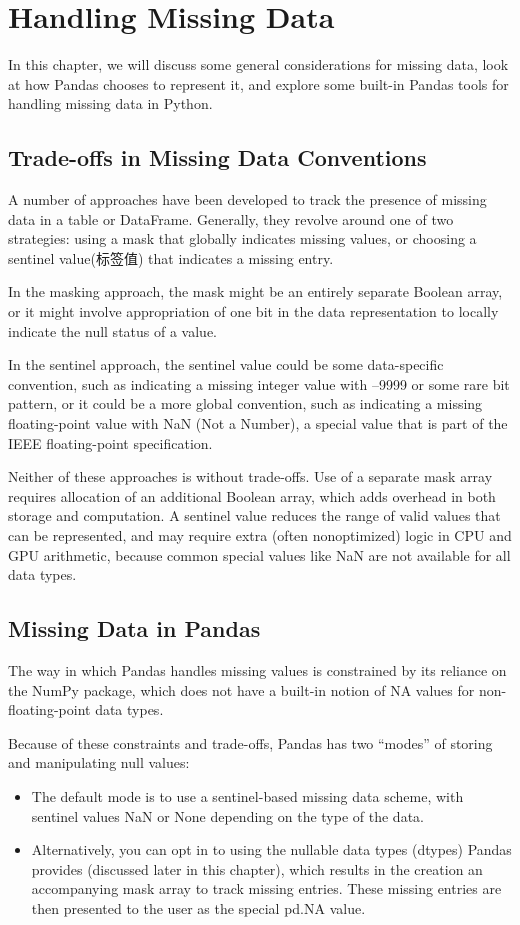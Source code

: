 \chapter{Handling Missing Data\label{Ch16}}
In this chapter, we will discuss some general considerations for missing data, look at
how Pandas chooses to represent it, and explore some built-in Pandas tools for handling missing data in Python.

\section{Trade-offs in Missing Data Conventions}
A number of approaches have been developed to track the presence of missing data in
a table or DataFrame. Generally, they revolve around one of two strategies: using a
mask that globally indicates missing values, or choosing a sentinel value(标签值) that indicates
a missing entry.

In the masking approach, the mask might be an entirely separate Boolean array, or it
might involve appropriation of one bit in the data representation to locally indicate
the null status of a value.

In the sentinel approach, the sentinel value could be some data-specific convention,
such as indicating a missing integer value with –9999 or some rare bit pattern, or it
could be a more global convention, such as indicating a missing floating-point value
with NaN (Not a Number), a special value that is part of the IEEE floating-point
specification.

Neither of these approaches is without trade-offs. Use of a separate mask array
requires allocation of an additional Boolean array, which adds overhead in both storage and computation. A sentinel value reduces the range of valid values that can be
represented, and may require extra (often nonoptimized) logic in CPU and GPU
arithmetic, because common special values like NaN are not available for all data
types.

\section{Missing Data in Pandas}
The way in which Pandas handles missing values is constrained by its reliance on the
NumPy package, which does not have a built-in notion of NA values for non-
floating-point data types.

Because of these constraints and trade-offs, Pandas has two “modes” of storing and
manipulating null values:
\begin{itemize}
    \item The default mode is to use a sentinel-based missing data scheme, with sentinel
          values NaN or None depending on the type of the data.
    \item Alternatively, you can opt in to using the nullable data types (dtypes) Pandas provides (discussed later in this chapter), which results in the creation an accompanying mask array to track missing entries. These missing entries are then
          presented to the user as the special pd.NA value.
\end{itemize}
